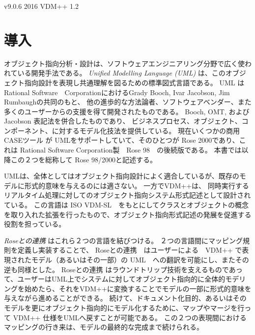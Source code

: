 \documentclass[\pformat,12pt]{jarticle}
\newcommand{\vdmpp}{VDM++}
\newcommand{\link}{Roseとの連携}
\newcommand{\rose}{Rose 98/2000}
\begin{document}
       {v9.0.6}
       {2016}
       {VDM++}
       {1.2}




\section{導入} \label{intro}

オブジェクト指向分析・設計は、ソフトウェアエンジニアリング分野で広く使われている開発手法である。
{\it Unified Modelling Language (UML)} は、このオブジェクト指向設計を表現し共通理解を図るための標準図式言語である。
UML はRational Software　CorporationにおけるGrady Booch, Ivar Jacobson, Jim Rumbaughの共同のもと、 他の進歩的な方法論者、ソフトウェアベンダー、また多くのユーザーからの支援を得て開発されたものである。
Booch, OMT, およびJacobson 表記法を併合したものであり、 ビジネスプロセス、オブジェクト、コンポーネント、に対するモデル化技法を提供している。
現在いくつかの商用 CASEツール が UMLをサポートしていて、そのひとつが Rose 2000であり、これは Rational Software Corporation製　Rose 98　の後続版である。
本書では以降この２つを総称して \rose{}と記述する。

UMLは、全体としてはオブジェクト指向設計によく適合しているが、既存のモデルに形式的意味を与えるのには適さない。
一方で\vdmpp{}は、 同時実行するリアルタイム処理に対してのオブジェクト指向システム形式記述として設計されている。
この言語は ISO VDM-SL　をもとにしてクラスとオブジェクトの概念を取り入れた拡張を行ったもので、オブジェクト指向形式記述の発展を促進する役割を担っている。

 {\it \link{}} はこれら２つの言語を結びつける。
２つの言語間にマッピング規則を定義し実装することで、 \link{}　はユーザーによる　\vdmpp{} で表現されたモデル（あるいはその一部）の UML　への翻訳を可能にし、またその逆も同様とした。
 \link{} はラウンドトリップ技術を支えるものであって、ユーザーはUML上でシステムに対してオブジェクト指向的に全体的モデリングを始めたら、それを\vdmpp{}に変換することでモデルの一部に形式的意味を与えながら進めることができる。
続けて、ドキュメント化目的、あるいはそのモデルを更にオブジェクト指向的にモデル化するために、マップやマージを行って \vdmpp{} 仕様をUMLへ戻すことが可能である。
この２つの表現間におけるマッピングの行き来は、モデルの最終的な完成まで続けられる。
\end{document}
